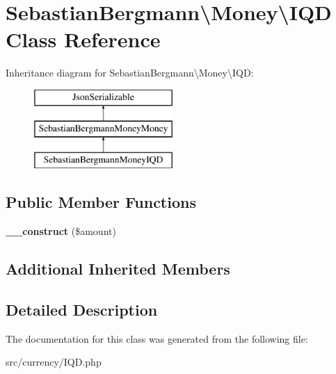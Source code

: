 \hypertarget{classSebastianBergmann_1_1Money_1_1IQD}{}\section{Sebastian\+Bergmann\textbackslash{}Money\textbackslash{}I\+Q\+D Class Reference}
\label{classSebastianBergmann_1_1Money_1_1IQD}
Inheritance diagram for Sebastian\+Bergmann\textbackslash{}Money\textbackslash{}I\+Q\+D\+:\begin{figure}[H]
\begin{center}
\leavevmode
\includegraphics[height=3.000000cm]{classSebastianBergmann_1_1Money_1_1IQD}
\end{center}
\end{figure}
\subsection*{Public Member Functions}
\begin{DoxyCompactItemize}
\item 
\hypertarget{classSebastianBergmann_1_1Money_1_1IQD_ad549083157afb0e2224fb87e39b9ddf4}{}{\bfseries \+\_\+\+\_\+construct} (\$amount)\label{classSebastianBergmann_1_1Money_1_1IQD_ad549083157afb0e2224fb87e39b9ddf4}

\end{DoxyCompactItemize}
\subsection*{Additional Inherited Members}


\subsection{Detailed Description}


The documentation for this class was generated from the following file\+:\begin{DoxyCompactItemize}
\item 
src/currency/I\+Q\+D.\+php\end{DoxyCompactItemize}
